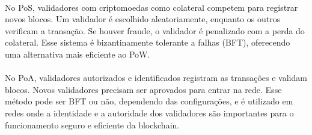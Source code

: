 \documentclass[letterpaper,11pt,leqno]{article}
\begin{document}
\paragraph{}
No PoS, validadores com criptomoedas como colateral competem para registrar
novos blocos. Um validador é escolhido aleatoriamente, enquanto os outros
verificam a transação. Se houver fraude, o validador é penalizado com a perda do
colateral. Esse sistema é bizantinamente tolerante a falhas (BFT), oferecendo
uma alternativa mais eficiente ao PoW.

\paragraph{}
No PoA, validadores autorizados e identificados registram as transações e
validam blocos. Novos validadores precisam ser aprovados para entrar na rede.
Esse método pode ser BFT ou não, dependendo das configurações, e é utilizado em
redes onde a identidade e a autoridade dos validadores são importantes para o
funcionamento seguro e eficiente da blockchain.

% 
\end{document}
